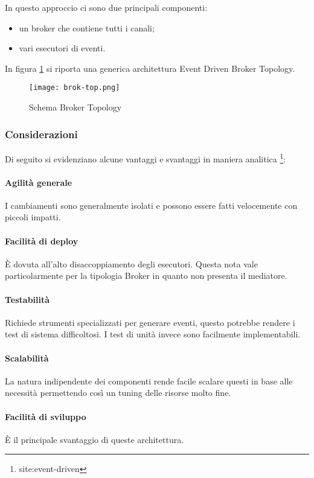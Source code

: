 In questo approccio ci sono due principali componenti:
\begin{itemize}
    \item un broker che contiene tutti i canali;
    \item vari esecutori di eventi.
\end{itemize}
    
In figura \ref{fig:eventdriven-bro-top} si riporta una generica architettura Event Driven Broker Topology.

\begin{figure}[htbp]
    \centering
    \texttt{[image: brok-top.png]} 
    \caption{Schema Broker Topology}
    \label{fig:eventdriven-bro-top} 
\end{figure}

\subsubsection{Considerazioni}
Di seguito si evidenziano alcune vantaggi e svantaggi in maniera analitica \footnote{site:event-driven}:
\paragraph{Agilità generale}
I cambiamenti sono generalmente isolati e possono essere fatti velocemente con piccoli impatti.
\paragraph{Facilità di deploy}
È dovuta all’alto disaccoppiamento degli esecutori. Questa nota vale particolarmente per la tipologia Broker in quanto non presenta il mediatore.
\paragraph{Testabilità}
Richiede strumenti specializzati per generare eventi, questo potrebbe rendere i test di sistema difficoltosi. I test di unità invece sono facilmente implementabili. 
\paragraph{Scalabilità}
La natura indipendente dei componenti rende facile scalare questi in base alle necessità permettendo così un tuning delle risorse molto fine.
\paragraph{Facilità di sviluppo }
È il principale svantaggio di queste architettura.


